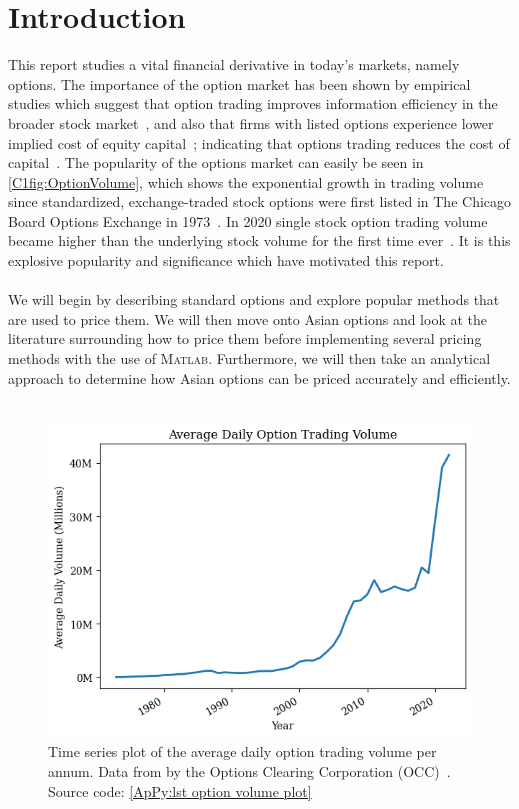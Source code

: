 \chapter{Introduction}
This report studies a vital financial derivative in today's markets, namely options. The importance of the option market has been shown by empirical studies which suggest that option trading improves information efficiency in the broader stock market~\cite{PanInfoEffic,li2021effect}, and also that firms with listed options experience lower implied cost of equity capital~\cite{naikerLowEquity}; indicating that options trading reduces the cost of capital~\cite{li2021effect}. The popularity of the options market can easily be seen in \autoref{C1fig:OptionVolume}, which shows the exponential growth in trading volume since standardized, exchange-traded stock options were first listed in The Chicago Board Options Exchange in 1973~\cite{markham2002financial}. In 2020 single stock option trading volume became higher than the underlying stock volume for the first time ever~\cite{yahooOptions}. 
\nline{}
It is this explosive popularity and significance which have motivated this report. 
\\\\
We will begin by describing standard options and explore popular methods that are used to price them. We will then move onto Asian options and look at the literature surrounding how to price them before implementing several pricing methods with the use of \textsc{Matlab}. Furthermore, we will then take an analytical approach to determine how Asian options can be priced accurately and efficiently.
\\\\

\begin{figure}[H]
    \centering
    \includegraphics[width=\sOneSize\textwidth]{Chapters/C1/plots/OptionVolume.png}
    \caption{Time series plot of the average daily option trading volume per annum. Data from by the Options Clearing Corporation (OCC)~\cite{THEOCC}. Source code: \autoref{ApPy:lst option volume plot}}\label{C1fig:OptionVolume}\end{figure}

